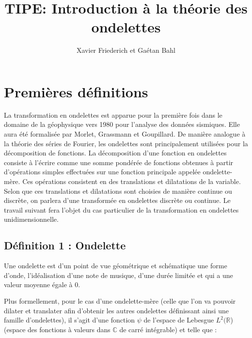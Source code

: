 \documentclass{article}
\title{TIPE: Introduction à la théorie des ondelettes}
\author{Xavier Friederich et Gaétan Bahl}
\begin{document}
\maketitle
\tableofcontents
\listoffigures
{}
\clearpage

\newcommand{\fonction}[5]{\begin{array}{l|rcl}
#1: & #2 & \longrightarrow & #3 \\
    & #4 & \longmapsto & #5 \end{array}}




\section{Premières définitions}


La transformation en ondelettes est apparue pour la première fois dans le domaine de la géophysique vers 1980 pour l’analyse des données sismiques. Elle aura été formalisée par Morlet, Grassmann et Goupillard.
De manière analogue à la théorie des séries de Fourier, les ondelettes sont principalement utilisées pour la décomposition de fonctions. La décomposition d’une fonction en ondelettes consiste à l’écrire comme une somme pondérée de fonctions obtenues à partir d’opérations simples effectuées sur une fonction principale appelée ondelette-mère. Ces opérations consistent en des translations et dilatations de la variable. Selon que ces translations et dilatations sont choisies de manière continue ou discrète, on parlera d’une transformée en ondelettes discrète ou continue.
Le travail suivant fera l’objet du cas particulier de la transformation en ondelettes unidimensionnelle.


\subsection{Définition 1 : Ondelette}

Une ondelette est d’un point de vue géométrique et schématique une forme d’onde, l’idéalisation d’une note de musique, d’une durée limitée et qui a une valeur moyenne égale à 0. 

Plus formellement, pour le cas d’une ondelette-mère (celle que l’on va pouvoir dilater et translater afin d’obtenir les autres ondelettes définissant ainsi une famille d’ondelettes), il s’agit d’une fonction $\psi$ de l'espace de Lebesgue $L^2(\mathbb{R}$) (espace des fonctions à valeurs dans $\mathbb{C}$ de carré intégrable) et telle que :
\end{document}

